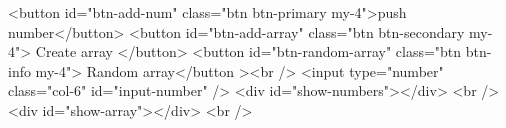     <button id="btn-add-num" class="btn btn-primary my-4">push number</button>
      <button id="btn-add-array" class="btn btn-secondary my-4">
        Create array
      </button>
      <button id="btn-random-array" class="btn btn-info my-4">
        Random array</button
      ><br />
      <input type="number" class="col-6" id="input-number" />
      <div id="show-numbers"></div>
      <br />
      <div id="show-array"></div>
      <br />